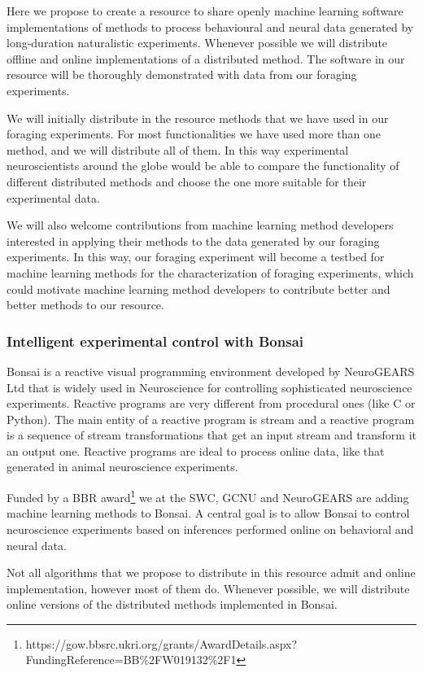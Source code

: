 Here we propose to create a resource to share openly machine learning software
implementations of methods to process behavioural and neural data generated by
long-duration naturalistic experiments. Whenever possible we will distribute
offline and online implementations of a distributed method. The software in our
resource will be thoroughly demonstrated with data from our foraging
experiments.

We will initially distribute in the resource methods that we have used in our
foraging experiments. For most functionalities we have used more than one
method, and we will distribute all of them. In this way experimental
neuroscientists around the globe would be able to compare the functionality of
different distributed methods and choose the one more suitable for their
experimental data.

We will also welcome contributions from machine learning method developers
interested in applying their methods to the data generated by our foraging
experiments. In this way, our foraging experiment will become a testbed for
machine learning methods for the characterization of foraging experiments,
which could motivate machine learning method developers to contribute better
and better methods to our resource.

\subsubsection*{Intelligent experimental control with Bonsai}

Bonsai is a reactive visual programming environment developed by NeuroGEARS Ltd
that is widely used in Neuroscience for controlling sophisticated neuroscience
experiments. Reactive programs are very different from procedural ones (like C
or Python). The main entity of a reactive program is stream and a reactive
program is a sequence of stream transformations that get an input stream and
transform it an output one. Reactive programs are ideal to process online data,
like that generated in animal neuroscience experiments.

Funded by a BBR
award\footnote{https://gow.bbsrc.ukri.org/grants/AwardDetails.aspx?FundingReference=BB\%2FW019132\%2F1}
we at the SWC, GCNU and NeuroGEARS are adding machine learning methods to
Bonsai. A central goal is to allow Bonsai to control neuroscience experiments
based on inferences performed online on behavioral and neural data.

Not all algorithms that we propose to distribute in this resource admit and
online implementation, however most of them do. Whenever possible, we will
distribute online versions of the distributed methods implemented in Bonsai.

